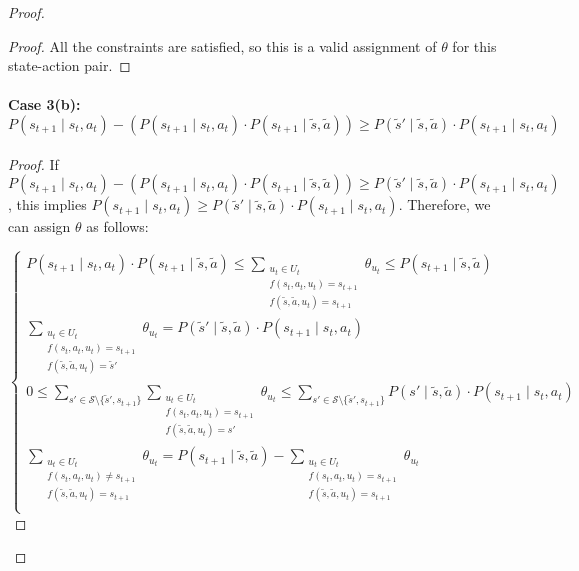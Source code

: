 \begin{proof}
\begin{proof}
All the constraints are satisfied, so this is a valid assignment of $\theta$ for this state-action pair.
\end{proof}
\paragraph{Case 3(b): $P(s_{t+1} \mid s_t, a_t) - (P(s_{t+1} \mid s_t, a_t) \cdot P(s_{t+1} \mid \tilde{s}, \tilde{a})) \geq P(\tilde{s}' \mid \tilde{s}, \tilde{a}) \cdot P(s_{t+1} \mid s_t, a_t)$}
\noindent
\begin{proof}
If $P(s_{t+1} \mid s_t, a_t) - (P(s_{t+1} \mid s_t, a_t) \cdot P(s_{t+1} \mid \tilde{s}, \tilde{a})) \geq P(\tilde{s}' \mid \tilde{s}, \tilde{a}) \cdot P(s_{t+1} \mid s_t, a_t)$, this implies $P(s_{t+1} \mid s_t, a_t) \geq P(\tilde{s}' \mid \tilde{s}, \tilde{a}) \cdot P(s_{t+1} \mid s_t, a_t)$. Therefore, we can assign $\theta$ as follows:

 \[
    \begin{cases}
        P(s_{t+1} \mid s_t, a_t) \cdot P(s_{t+1} \mid \tilde{s}, \tilde{a}) \leq \sum_{\substack{u_t \in U_t \\f(s_t, a_t, u_t) = s_{t+1} \\ f(\tilde{s}, \tilde{a}, u_t) = s_{t+1}}}{\theta_{u_t}} \leq P(s_{t+1} \mid \tilde{s}, \tilde{a}) \\
        
        \sum_{\substack{u_t \in U_t \\f(s_t, a_t, u_t) = s_{t+1} \\ f(\tilde{s}, \tilde{a}, u_t) = \tilde{s}'}}{\theta_{u_t}} = P(\tilde{s}' \mid \tilde{s}, \tilde{a}) \cdot P(s_{t+1} \mid s_t, a_t)\\
        
        0 \leq \sum_{s' \in \mathcal{S}\setminus\{\tilde{s}', s_{t+1}\}}\sum_{\substack{u_t \in U_t \\f(s_t, a_t, u_t) = s_{t+1} \\ f(\tilde{s}, \tilde{a}, u_t) = s'}}{\theta_{u_t}} \leq \sum_{s' \in \mathcal{S}\setminus\{\tilde{s}', s_{t+1}\}}P(s' \mid \tilde{s}, \tilde{a}) \cdot P(s_{t+1} \mid s_t, a_t)\\
        
        \sum_{\substack{u_t \in U_t \\f(s_t, a_t, u_t) \neq s_{t+1} \\ f(\tilde{s}, \tilde{a}, u_t) = s_{t+1}}}{\theta_{u_t}} = P(s_{t+1} \mid \tilde{s}, \tilde{a}) - \sum_{\substack{u_t \in U_t \\f(s_t, a_t, u_t) = s_{t+1} \\ f(\tilde{s}, \tilde{a}, u_t) = s_{t+1}}}{\theta_{u_t}} \\
        

\end{cases}\]
\end{proof}
\end{proof}
